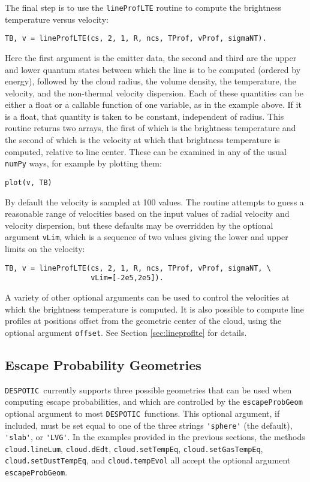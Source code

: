 \documentclass[12pt]{article}
\newcommand{\despotic}{\texttt{DESPOTIC}}
\begin{document}
The final step is to use the \verb=lineProfLTE= routine to compute the brightness temperature versus velocity:
\begin{verbatim}
TB, v = lineProfLTE(cs, 2, 1, R, ncs, TProf, vProf, sigmaNT).
\end{verbatim}
Here the first argument is the emitter data, the second and third are the upper and lower quantum states between which the line is to be computed (ordered by energy), followed by the cloud radius, the volume density, the temperature, the velocity, and the non-thermal velocity dispersion. Each of these quantities can be either a float or a callable function of one variable, as in the example above. If it is a float, that quantity is taken to be constant, independent of radius. This routine returns two arrays, the first of which is the brightness temperature and the second of which is the velocity at which that brightness temperature is computed, relative to line center. These can be examined in any of the usual \verb=numPy= ways, for example by plotting them:
\begin{verbatim}
plot(v, TB)
\end{verbatim}

By default the velocity is sampled at 100 values. The routine attempts to guess a reasonable range of velocities based on the input values of radial velocity and velocity dispersion, but these defaults may be overridden by the optional argument \verb=vLim=, which is a sequence of two values giving the lower and upper limits on the velocity:
\begin{verbatim}
TB, v = lineProfLTE(cs, 2, 1, R, ncs, TProf, vProf, sigmaNT, \
                    vLim=[-2e5,2e5]).
\end{verbatim}
A variety of other optional arguments can be used to control the velocities at which the brightness temperature is computed. It is also possible to compute line profiles at positions offset from the geometric center of the cloud, using the optional argument \verb=offset=. See Section \ref{sec:lineproflte} for details.


\subsection{Escape Probability Geometries}
\label{sec:escapeprobgeom}

\despotic\ currently supports three possible geometries that can be used when computing escape probabilities, and which are controlled by the \verb=escapeProbGeom= optional argument to most \despotic\ functions. This optional argument, if included, must be set equal to one of the three strings \verb='sphere'= (the default), \verb='slab'=, or \verb='LVG'=. In the examples provided in the previous sections, the methods \verb=cloud.lineLum=, \verb=cloud.dEdt=, \verb=cloud.setTempEq=, \verb=cloud.setGasTempEq=, \verb=cloud.setDustTempEq=, and \verb=cloud.tempEvol= all accept the optional argument 
\verb=escapeProbGeom=.
\end{document}
